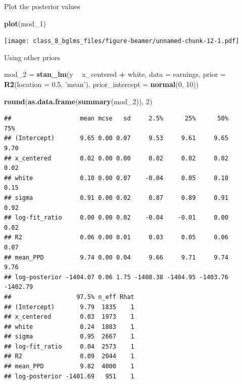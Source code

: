 \documentclass[ignorenonframetext,]{beamer}
\newenvironment{Shaded}{\begin{snugshade}}{\end{snugshade}}
\newcommand{\KeywordTok}[1]{\textcolor[rgb]{0.13,0.29,0.53}{\textbf{#1}}}
\newcommand{\DataTypeTok}[1]{\textcolor[rgb]{0.13,0.29,0.53}{#1}}
\newcommand{\DecValTok}[1]{\textcolor[rgb]{0.00,0.00,0.81}{#1}}
\newcommand{\FloatTok}[1]{\textcolor[rgb]{0.00,0.00,0.81}{#1}}
\newcommand{\StringTok}[1]{\textcolor[rgb]{0.31,0.60,0.02}{#1}}
\newcommand{\OperatorTok}[1]{\textcolor[rgb]{0.81,0.36,0.00}{\textbf{#1}}}
\newcommand{\NormalTok}[1]{#1}
\begin{document}
\begin{frame}[fragile]{Plot the posterior values}

\begin{Shaded}
\begin{Highlighting}[]
\KeywordTok{plot}\NormalTok{(mod_}\DecValTok{1}\NormalTok{)}
\end{Highlighting}
\end{Shaded}

\texttt{[image: class\_8\_bglms\_files/figure-beamer/unnamed-chunk-12-1.pdf]}

\end{frame}

\begin{frame}[fragile]{Using other priors}

\tiny

\begin{Shaded}
\begin{Highlighting}[]
\NormalTok{mod_}\DecValTok{2}\NormalTok{ =}\StringTok{ }\KeywordTok{stan_lm}\NormalTok{(y }\OperatorTok{~}\StringTok{ }\NormalTok{x_centered }\OperatorTok{+}\StringTok{ }\NormalTok{white, }\DataTypeTok{data =}\NormalTok{ earnings,}
                \DataTypeTok{prior =} \KeywordTok{R2}\NormalTok{(}\DataTypeTok{location =} \FloatTok{0.5}\NormalTok{, }\StringTok{'mean'}\NormalTok{),}
                \DataTypeTok{prior_intercept =} \KeywordTok{normal}\NormalTok{(}\DecValTok{0}\NormalTok{, }\DecValTok{10}\NormalTok{))}
\end{Highlighting}
\end{Shaded}

\begin{Shaded}
\begin{Highlighting}[]
\KeywordTok{round}\NormalTok{(}\KeywordTok{as.data.frame}\NormalTok{(}\KeywordTok{summary}\NormalTok{(mod_}\DecValTok{2}\NormalTok{)), }\DecValTok{2}\NormalTok{)}
\end{Highlighting}
\end{Shaded}

\begin{verbatim}
##                   mean mcse   sd     2.5%      25%      50%      75%
## (Intercept)       9.65 0.00 0.07     9.53     9.61     9.65     9.70
## x_centered        0.02 0.00 0.00     0.02     0.02     0.02     0.02
## white             0.10 0.00 0.07    -0.04     0.05     0.10     0.15
## sigma             0.91 0.00 0.02     0.87     0.89     0.91     0.92
## log-fit_ratio     0.00 0.00 0.02    -0.04    -0.01     0.00     0.02
## R2                0.06 0.00 0.01     0.03     0.05     0.06     0.07
## mean_PPD          9.74 0.00 0.04     9.66     9.71     9.74     9.76
## log-posterior -1404.07 0.06 1.75 -1408.38 -1404.95 -1403.76 -1402.79
##                  97.5% n_eff Rhat
## (Intercept)       9.79  1835    1
## x_centered        0.03  1973    1
## white             0.24  1883    1
## sigma             0.95  2667    1
## log-fit_ratio     0.04  2573    1
## R2                0.09  2044    1
## mean_PPD          9.82  4000    1
## log-posterior -1401.69   951    1
\end{verbatim}

\end{frame}
\end{document}

